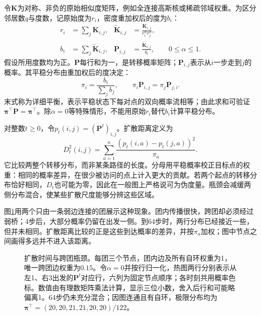 令$\bm{K}$为对称、非负的原始相似度矩阵，例如全连接高斯核或稀疏邻域权重。为区分邻居数$q$与度数，记原始度为$r_i$，密度重加权后的度为$b_i$：
\begin{equation}
  \label{eq:dim-diffusion-normalization}
  \begin{aligned}
    r_i&=\sum_j\bm{K}_{i,j},&
    \widetilde{\bm{K}}_{i,j}
      &=\frac{\bm{K}_{i,j}}{r_i^\alpha r_j^\alpha},\\
    b_i&=\sum_j\widetilde{\bm{K}}_{i,j},&
    \bm{P}_{i,j}&=\frac{\widetilde{\bm{K}}_{i,j}}{b_i},
    \qquad 0\leq\alpha\leq1.
  \end{aligned}
\end{equation}
假设所用度数均为正。$\bm{P}$每行和为一，是转移概率矩阵；$\bm{P}_{i,j}$表示从$i$一步走到$j$的概率。其平稳分布由重加权后的度决定：
\begin{equation}
  \label{eq:dim-diffusion-stationary}
  \pi_i=\frac{b_i}{\sum_j b_j},
  \qquad
  \pi_i\bm{P}_{i,j}=\pi_j\bm{P}_{j,i}.
\end{equation}
末式称为详细平衡，表示平稳状态下每对点的双向概率流相等；由此求和可验证$\bm{\pi}^{\top}\bm{P}=\bm{\pi}^{\top}$。除$\alpha=0$等特殊情形，不能用原始$r_i$替代$b_i$计算平稳分布。

对整数$t\geq0$，令$p_t(i,j)=(\bm{P}^t)_{i,j}$。扩散距离定义为
\begin{equation}
  \label{eq:dim-diffusion-distance}
  D_t^2(i,j)
  =\sum_{a=1}^n\frac{(p_t(i,a)-p_t(j,a))^2}{\pi_a}.
\end{equation}
它比较两整个转移分布，而非某条路径的长度。分母用平稳概率校正目标点的权重：相同的概率差异，在很少被访问的点上计入更大的贡献。若两个起点的转移分布恰好相同，$D_t$也可能为零，因此在一般图上严格说可为伪度量。瓶颈会减缓两侧分布混合，使某些扩散尺度能够分辨这些区域。

图\ref{fig:dim-diffusion-walk}用两个只由一条弱边连接的团展示这种现象。团内传播很快，跨团却必须经过弱桥；4步后，大部分概率仍留在出发一侧。到64步时，两行分布已经接近一些，但并未相同。扩散距离比较的正是这些到达概率的差异，并按$\pi_a$加权；图中节点之间画得多远并不进入该距离。

\begin{figure}[htbp]
  \centering
  
  \caption{扩散时间与跨团瓶颈。每团三个节点，团内边及所有自环权重为1，唯一跨团边权重为$0.15$。令$\alpha=0$并按行归一化，热图两行分别表示从左1、右3出发的$\bm{P}^t$对应行，六列为固定节点顺序；各时刻共用概率色标。数值由有理数矩阵乘法计算，显示三位小数，舍入后行和可能略偏离1。64步仍未充分混合；因图连通且有自环，极限分布均为$\bm{\pi}^{\top}=(20,20,21,21,20,20)/122$。}
  \label{fig:dim-diffusion-walk}
\end{figure}

